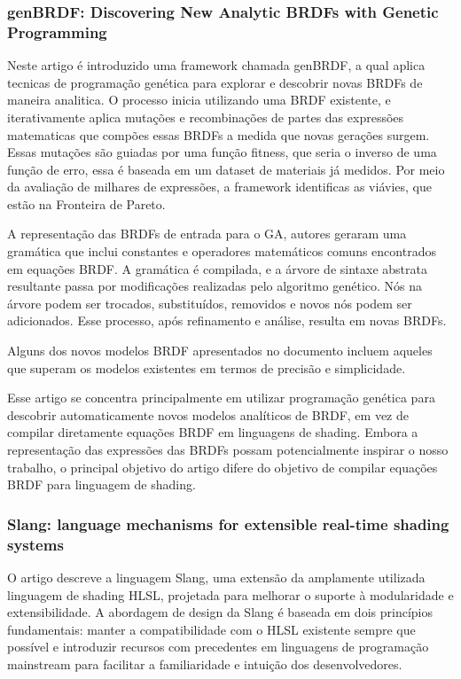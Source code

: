 \documentclass[english, 
               brazil, 
               bsc] %
               {dcomp-abntex2}
\begin{document}
\subsubsection{genBRDF: Discovering New Analytic BRDFs with Genetic Programming}

Neste artigo é introduzido uma framework chamada genBRDF, a qual aplica tecnicas de programação genética para explorar e descobrir novas BRDFs de maneira analitica. O processo inicia utilizando uma BRDF existente, e iterativamente aplica mutações e recombinações de partes das expressões matematicas que compões essas BRDFs a medida que novas gerações surgem. Essas mutações são guiadas por uma função fitness, que seria o inverso de uma função de erro, essa é baseada em um dataset de materiais já medidos. Por meio da avaliação de milhares de expressões, a framework identificas as viávies, que estão na Fronteira de Pareto.

A representação das BRDFs de entrada para o GA, autores geraram uma gramática que inclui constantes e operadores matemáticos comuns encontrados em equações BRDF. A gramática é compilada, e a árvore de sintaxe abstrata resultante passa por modificações realizadas pelo algoritmo genético. Nós na árvore podem ser trocados, substituídos, removidos e novos nós podem ser adicionados. Esse processo, após refinamento e análise, resulta em novas BRDFs.

Alguns dos novos modelos BRDF apresentados no documento incluem aqueles que superam os modelos existentes em termos de precisão e simplicidade.
 
Esse artigo se concentra principalmente em utilizar programação genética para descobrir automaticamente novos modelos analíticos de BRDF, em vez de compilar diretamente equações BRDF em linguagens de shading. Embora a representação das expressões das BRDFs possam potencialmente inspirar o nosso trabalho, o principal objetivo do artigo difere do objetivo de compilar equações BRDF para linguagem de shading.

\subsubsection{Slang: language mechanisms for extensible real-time shading systems}

O artigo descreve a linguagem Slang, uma extensão da amplamente utilizada linguagem de shading HLSL, projetada para melhorar o suporte à modularidade e extensibilidade. A abordagem de design da Slang é baseada em dois princípios fundamentais: manter a compatibilidade com o HLSL existente sempre que possível e introduzir recursos com precedentes em linguagens de programação mainstream para facilitar a familiaridade e intuição dos desenvolvedores.
\end{document}
